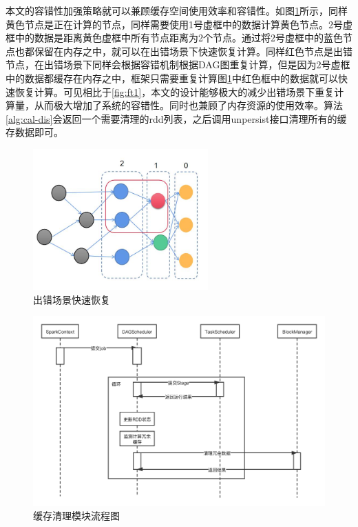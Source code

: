本文的容错性加强策略就可以兼顾缓存空间使用效率和容错性。如图\ref{fig:ft2}所示，同样黄色节点是正在计算的节点，同样需要使用1号虚框中的数据计算黄色节点。2号虚框中的数据是距离黄色虚框中所有节点距离为2个节点。通过将2号虚框中的蓝色节点也都保留在内存之中，就可以在出错场景下快速恢复计算。同样红色节点是出错节点，在出错场景下同样会根据容错机制根据DAG图重复计算，但是因为2号虚框中的数据都缓存在内存之中，框架只需要重复计算图\ref{fig:ft2}中红色框中的数据就可以快速恢复计算。可见相比于\ref{fig:ft1}，本文的设计能够极大的减少出错场景下重复计算量，从而极大增加了系统的容错性。同时也兼顾了内存资源的使用效率。算法\ref{alg:cal-dis}会返回一个需要清理的rdd列表，之后调用unpersist接口清理所有的缓存数据即可。

\begin{figure}[htbp]
    \centering
    \includegraphics[width=0.6\textwidth]{Img/ft2.png}
    \caption{出错场景快速恢复}
    \label{fig:ft2}
\end{figure}


\begin{figure}[htbp]
    \centering
    \includegraphics[width=1\textwidth]{Img/缓存清理模块流程图.png}
    \caption{缓存清理模块流程图}
    \label{fig:clean}
\end{figure}

